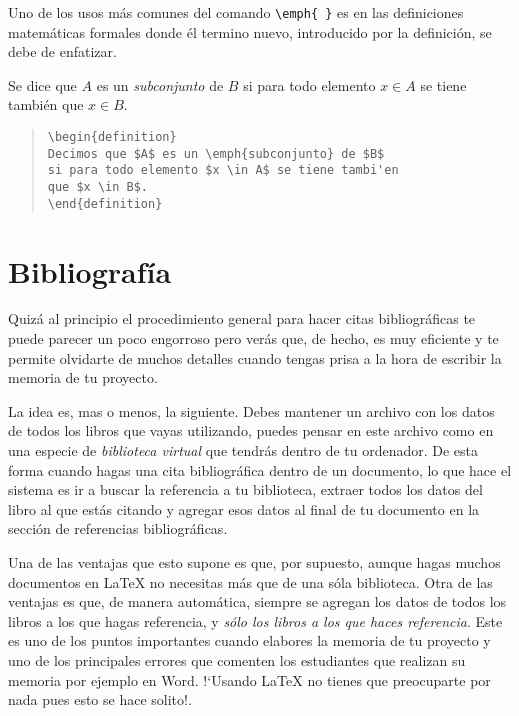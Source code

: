 Uno de los usos m\'as comunes del comando \verb|\emph{ }| es en las definiciones 
matem\'aticas formales donde \'el termino nuevo, introducido por la definici\'on,
se debe de enfatizar.

\begin{definition}
Se dice que $A$ es un \emph{subconjunto} de $B$ si para todo elemento $x \in A$ se tiene
tambi\'en que $x \in B$.
\end{definition}

\begin{quote}
\begin{verbatim}
\begin{definition}
Decimos que $A$ es un \emph{subconjunto} de $B$
si para todo elemento $x \in A$ se tiene tambi'en
que $x \in B$.
\end{definition}
\end{verbatim}
\end{quote}



\section{Bibliograf\'ia}

Quiz\'a al principio el procedimiento general para hacer citas bibliogr\'aficas te puede
parecer un poco engorroso pero ver\'as que, de hecho, es muy eficiente y te permite
olvidarte de muchos detalles cuando tengas prisa a la hora de escribir la memoria
de tu proyecto.

La idea es, mas o menos, la siguiente. Debes mantener un archivo con los datos de todos
los libros que vayas utilizando, puedes pensar en este archivo como en una especie de
\emph{biblioteca virtual} que tendr\'as dentro de tu ordenador. De esta forma cuando hagas una cita
bibliogr\'afica dentro de un documento, lo que hace el sistema es ir a buscar la referencia
a tu biblioteca, extraer todos los datos del libro al que est\'as citando y agregar esos datos
al final de tu documento en la secci\'on de referencias bibliogr\'aficas.

Una de las ventajas que esto supone es que, por supuesto, aunque hagas muchos documentos en \LaTeX{}
no necesitas m\'as que de una s\'ola biblioteca. Otra de las ventajas es que, de manera autom\'atica, siempre 
se agregan los datos de todos los libros a los que hagas referencia, y \emph{s\'olo los libros a los que haces 
referencia}. Este es uno de los puntos importantes cuando elabores la memoria de tu proyecto y uno de los 
principales errores que comenten los estudiantes que realizan su memoria por ejemplo en Word. 
!`Usando \LaTeX{} no tienes que preocuparte por nada pues esto se hace solito!.

